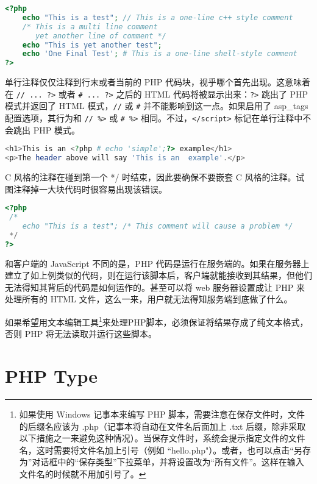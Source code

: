 \begin{lstlisting}[language=PHP]
<?php
    echo "This is a test"; // This is a one-line c++ style comment
    /* This is a multi line comment
       yet another line of comment */
    echo "This is yet another test";
    echo 'One Final Test'; # This is a one-line shell-style comment
?>
\end{lstlisting}

单行注释仅仅注释到行末或者当前的 PHP 代码块，视乎哪个首先出现。这意味着在 \texttt{// ... ?>} 或者 \texttt{\# ... ?>} 之后的 HTML 代码将被显示出来：\texttt{?>} 跳出了 PHP 模式并返回了 HTML 模式，\texttt{//} 或 \texttt{\#} 并不能影响到这一点。如果启用了 asp\_tags 配置选项，其行为和 \texttt{// \%>} 或 \texttt{\# \%>} 相同。不过，\texttt{</script>} 标记在单行注释中不会跳出 PHP 模式。

\begin{lstlisting}[language=PHP]
<h1>This is an <?php # echo 'simple';?> example</h1>
<p>The header above will say 'This is an  example'.</p>
\end{lstlisting}

C 风格的注释在碰到第一个 */ 时结束，因此要确保不要嵌套 C 风格的注释。试图注释掉一大块代码时很容易出现该错误。

\begin{lstlisting}[language=PHP]
<?php
 /*
    echo "This is a test"; /* This comment will cause a problem */
 */
?>
\end{lstlisting}

和客户端的 JavaScript 不同的是，PHP 代码是运行在服务端的。如果在服务器上建立了如上例类似的代码，则在运行该脚本后，客户端就能接收到其结果，但他们无法得知其背后的代码是如何运作的。甚至可以将 web 服务器设置成让 PHP 来处理所有的 HTML 文件，这么一来，用户就无法得知服务端到底做了什么。

如果希望用文本编辑工具\footnote{如果使用 Windows 记事本来编写 PHP 脚本，需要注意在保存文件时，文件的后缀名应该为 .php（记事本将自动在文件名后面加上 .txt 后缀，除非采取以下措施之一来避免这种情况）。当保存文件时，系统会提示指定文件的文件名，这时需要将文件名加上引号（例如 ``hello.php"）。或者，也可以点击“另存为”对话框中的“保存类型”下拉菜单，并将设置改为“所有文件”。这样在输入文件名的时候就不用加引号了。}来处理PHP脚本，必须保证将结果存成了纯文本格式，否则 PHP 将无法读取并运行这些脚本。


\chapter{PHP Type}


